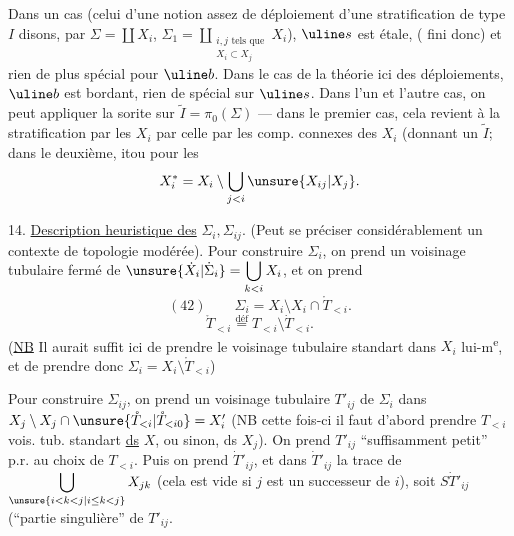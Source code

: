 Dans un cas (celui d'une notion assez 
 de déploiement d'une stratification de type $I$ disons,
par $\Sigma=\coprod X_i$,
$\Sigma_1=\displaystyle\coprod_{\substack{i,j\text{ tels que}\\X_i\subset X_j}}X_i$),
$\uline s$ est étale, ( fini donc) et rien de plus spécial pour $\uline b$.
Dans le cas de la théorie 
ici des déploiements,
$\uline b$ est bordant, rien de spécial sur $\uline s$.
Dans l'un et l'autre cas, on peut appliquer la sorite
sur $\widetilde I=\pi_0(\Sigma)$ --- dans le premier cas,
cela revient à  la stratification par les $X_i$ par celle
par les comp. connexes des $X_i$ (donnant un $\widetilde I$;
dans le deuxième,
itou pour les
\[
X_i^{*}=X_i\setminus\bigcup_{j<i}\unsure{X_{ij}|X_j}.
\]

14. \uline{Description heuristique des} $\Sigma_i,\Sigma_{ij}$.
(Peut se préciser considérablement  un contexte de topologie modérée).
Pour construire $\Sigma_i$, on prend un voisinage tubulaire
 fermé de
$\unsure{\dot X_i|\dot\Sigma_i}=\displaystyle\bigcup_{k<i}X_i$, et on prend
\[
(42)\qquad\Sigma_i=X_i\setminus X_i\cap\mathring T_{<i}.
\]
\[
\mathring T_{<i}\overset{\mathrm{déf}}{=}T_{<i}\setminus\dot T_{<i}.
\]
(\uline{NB} Il aurait suffit ici de prendre le voisinage tubulaire
standart dans $X_i$ lui-m\textsuperscript{e}, et de prendre donc
$\Sigma_i=X_i\setminus\mathring T_{<i}$)

Pour construire $\Sigma_{ij}$, on prend un voisinage tubulaire
$T'_{ij}$ de $\Sigma_i$ dans
$X_j\setminus X_j\cap\unsure{\mathring T_{<i}|\mathring T_{<i0}}=X'_i$
(NB cette fois-ci il faut  d'abord prendre
$T_{<i}$ vois. tub. standart \uline{ds} $X$, ou sinon, ds $X_j$).
On prend $T'_{ij}$ ``suffisamment petit'' p.r. au choix de $T_{<i}$.
Puis on prend $\dot T'_{ij}$, et dans $\dot T'_{ij}$
la trace de $\displaystyle\bigcup_{\unsure{i<k<j|i\leq k<j}}X_{jk}$
(cela est vide si $j$ est un successeur de $i$), soit $S\dot T'_{ij}$
(``partie singulière'' de $T'_{ij}$.



